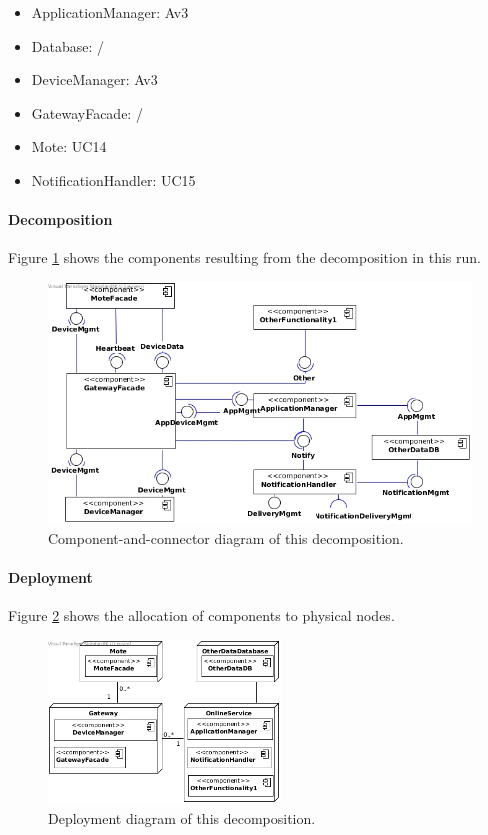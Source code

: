     \begin{itemize}
        \item ApplicationManager: Av3
        \item Database: /
        \item DeviceManager: Av3
        \item GatewayFacade: /
        \item Mote: UC14
        \item NotificationHandler: UC15
    \end{itemize}

    \paragraph{Decomposition}
        Figure \ref{fig:it1-cc_main} shows the components resulting from the
        decomposition in this run.

        \begin{figure}[!htp]
        	\centering
        	\includegraphics[width=1.00\textwidth]{images/component-diagram-1}
        	\caption{Component-and-connector diagram of this decomposition.}
            \label{fig:it1-cc_main}
        \end{figure}

    \paragraph{Deployment}
        Figure \ref{fig:it1-depl_main} shows the allocation of components
        to physical nodes.

        \begin{figure}[!htp]
        	\centering
        	\includegraphics[width=0.55\textwidth]{images/deployment-diagram-1}
        	\caption{Deployment diagram of this decomposition.}\label{fig:it1-depl_main}
        \end{figure}


